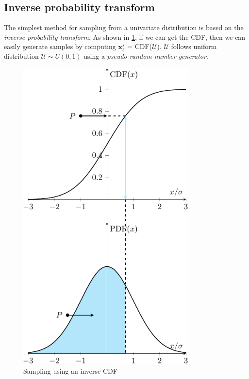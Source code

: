 \subsection{Inverse probability transform}
The simplest method for sampling from a univariate distribution is based on the \textit{inverse probability transform}. As shown in \cref{fig: CDF}, if we can get the \acrfull{CDF}, then we can easily generate samples by computing $\boldsymbol{x}_{t}^{s}$ = CDF($\mathcal{U}$). $\mathcal{U}$ follows uniform distribution $\mathcal{U} \sim U(0,1)$ using a \textit{pseudo random number generator}.
\begin{figure}[htbp]
    \centering
    \includegraphics[width = 90mm]{Figures/figure-CDF.pdf}
    \caption{Sampling using an inverse CDF}
    \label{fig: CDF}
\end{figure}
